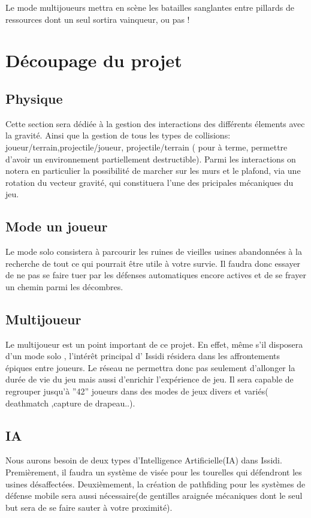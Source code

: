 ﻿\documentclass{article}
\begin{document}
Le mode multijoueurs mettra en scène les batailles sanglantes entre pillards de ressources dont un seul 
sortira vainqueur, ou pas !

\section{Découpage du projet}

\subsection{Physique}
Cette section sera dédiée à la gestion des interactions des différents élements avec la gravité.
Ainsi que la gestion de tous les types de collisions: joueur/terrain,projectile/joueur, projectile/terrain ( pour à terme, permettre d'avoir un
environnement partiellement destructible). Parmi les interactions on notera en particulier la possibilité de marcher sur 
les murs et le plafond, via une rotation du vecteur gravité, qui constituera l'une des pricipales mécaniques du jeu.

\subsection{Mode un joueur}
Le mode solo consistera à parcourir les
 ruines de vieilles usines abandonnées à la recherche de 
 tout ce qui pourrait être utile à votre survie. Il 
 faudra donc essayer de ne pas se faire tuer par les défenses 
 automatiques encore actives et de se frayer un chemin parmi
 les décombres.

\subsection{Multijoueur}
Le multijoueur est un point important de ce projet. En effet, même s'il disposera d'un mode solo , l'intérêt principal d' Issidi résidera dans les affrontements épiques
entre joueurs. Le réseau ne permettra donc pas seulement d'allonger la durée de vie du jeu mais aussi d'enrichir
l'expérience de jeu. Il sera capable de regrouper jusqu'à ''42'' joueurs dans des modes de jeux divers et
variés( deathmatch ,capture de drapeau..). 

\subsection{IA}
Nous aurons besoin de deux types 
d'Intelligence Artificielle(IA) dans Issidi.
Premièrement, il faudra un système de visée
 pour les tourelles qui défendront les usines
 désaffectées. Deuxièmement, la création de pathfiding pour les 
 systèmes de défense mobile sera aussi nécessaire(de gentilles araignée
 mécaniques dont le seul but sera de se faire sauter à votre proximité).
\end{document}
